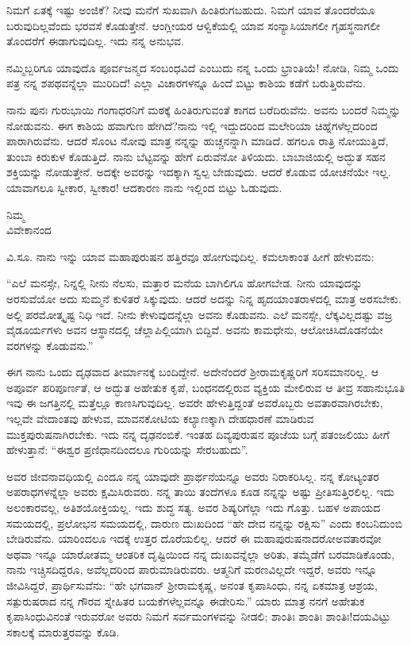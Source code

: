 ನಿಮಗೆ ಏತಕ್ಕೆ ಇಷ್ಟು ಅಂಜಿಕೆ? ನೀವು ಮನೆಗೆ ಸುಖವಾಗಿ ಹಿಂತಿರುಗಬಹುದು. ನಿಮಗೆ ಯಾವ ತೊಂದರೆಯೂ ಬರುವುದಿಲ್ಲವೆಂದು ಭರವಸೆ ಕೊಡುತ್ತೇನೆ. ಆಂಗ್ಲೀಯರ ಆಳ್ವಿಕೆಯಲ್ಲಿ ಯಾವ ಸಂನ್ಯಾಸಿಯಾಗಲೀ ಗೃಹಸ್ಥನಾಗಲೀ ತೊಂದರೆಗೆ ಈಡಾಗುವುದಿಲ್ಲ. ಇದು ನನ್ನ ಅನುಭವ.

ನಮ್ಮಿಬ್ಬರಿಗೂ ಯಾವುದೊ ಪೂರ್ವಜನ್ಮದ ಸಂಬಂಧವಿದೆ ಎಂಬುದು ನನ್ನ ಒಂದು ಭ್ರಾಂತಿಯೆ! ನೋಡಿ, ನಿಮ್ಮ ಒಂದು ಪತ್ರ ನನ್ನ ಶಪಥವನ್ನೆಲ್ಲಾ ಮುರಿದಿದೆ! ಎಲ್ಲಾ ವಿಚಾರಗಳನ್ನೂ ಹಿಂದೆ ಬಿಟ್ಟು ಕಾಶಿಯ ಕಡೆಗೆ ಬರುತ್ತಿರುವೆನು.

ನಾನು ಪುನಃ ಗುರುಭಾಯಿ ಗಂಗಾಧರನಿಗೆ ಮಠಕ್ಕೆ ಹಿಂತಿರುಗುವಂತೆ ಕಾಗದ ಬರೆದಿರುವೆನು. ಅವನು ಬಂದರೆ ನಿಮ್ಮನ್ನು ನೋಡುವನು. ಈಗ ಕಾಶಿಯ ಹವಾಗುಣ ಹೇಗಿದೆ?ನಾನು ಇಲ್ಲಿ ಇದ್ದುದರಿಂದ ಮಲೇರಿಯಾ ಚಿಹ್ನೆಗಳೆಲ್ಲದರಿಂದ ಪಾರಾಗಿರುವೆನು. ಆದರೆ ಸೊಂಟ ನೋವು ಮಾತ್ರ ನನ್ನನ್ನು ಹುಚ್ಚನನ್ನಾಗಿ ಮಾಡಿದೆ. ಹಗಲೂ ರಾತ್ರಿ ನೋಯುತ್ತಿದೆ, ತುಂಬಾ ಕಿರುಕುಳ ಕೊಡುತ್ತಿದೆ. ನಾನು ಬೆಟ್ಟವನ್ನು ಹೇಗೆ ಏರುವೆನೋ ತಿಳಿಯದು. ಬಾಬಾಜಿಯಲ್ಲಿ ಅದ್ಭುತ ಸಹನ ಶಕ್ತಿಯನ್ನು ನೋಡುತ್ತೇನೆ. ಅದಕ್ಕೇ ಅವರನ್ನು ಇದಕ್ಕಾಗಿ ಸ್ವಲ್ಪ ಬೇಡುವುದು. ಆದರೆ ಕೊಡುವ ಯೋಚನೆಯೇ ಇಲ್ಲ. ಯಾವಾಗಲೂ ಸ್ವೀಕಾರ, ಸ್ವೀಕಾರ! ಆದಕಾರಣ ನಾನು ಇಲ್ಲಿಂದ ಬಿಟ್ಟು ಓಡುವುದು.

{\flushright
ನಿಮ್ಮ\\ವಿವೇಕಾನಂದ\par}

ವಿ.ಸೂ. \enginline{-}ನಾನು ಇನ್ನು ಯಾವ ಮಹಾಪುರುಷನ ಹತ್ತಿರವೂ ಹೋಗುವುದಿಲ್ಲ. ಕಮಲಾಕಾಂತ ಹೀಗೆ ಹೇಳುವನು:

“ಎಲೆ ಮನಸ್ಸೇ, ನಿನ್ನಲ್ಲಿ ನೀನು ನೆಲಸು, ಮತ್ತಾರ ಮನೆಯ ಬಾಗಿಲಿಗೂ ಹೋಗಬೇಡ. ನೀನು ಯಾವುದನ್ನು ಅರಸುವೆಯೋ ಅದು ಸುಮ್ಮನೆ ಕುಳಿತರೆ ಸಿಕ್ಕುವುದು. ಆದರೆ ಅದನ್ನು ನಿನ್ನ ಹೃದಯಾಂತರಾಳದಲ್ಲಿ ಮಾತ್ರ ಅರಸಬೇಕು. ಅಲ್ಲಿ ಪರಮೋತ್ಕೃಷ್ಟ ನಿಧಿ ಇದೆ. ನೀನು ಕೇಳುವುದನ್ನೆಲ್ಲಾ ಅವನು ಕೊಡುವನು. ಎಲೆ ಮನಸ್ಸೇ, ಲೆಕ್ಕವಿಲ್ಲದಷ್ಟು ವಜ್ರ ವೈಡೂರ್ಯಗಳು ಅವನ ಆಸ್ಥಾನದಲ್ಲಿ ಚೆಲ್ಲಾಪಿಲ್ಲಿಯಾಗಿ ಬಿದ್ದಿವೆ. ಅವನು ಕಾಮಧೇನು, ಆಲೋಚಿಸಿದೊಡನೆಯೇ ವರಗಳನ್ನು ಕೊಡುವನು.”

ಈಗ ನಾನು ಒಂದು ದೃಢವಾದ ತೀರ್ಮಾನಕ್ಕೆ ಬಂದಿದ್ದೇನೆ. ಅದೇನೆಂದರೆ ಶ‍್ರೀರಾಮ\break ಕೃಷ್ಣರಿಗೆ ಸರಿಸಮಾನರಿಲ್ಲ. ಆ ಅಪೂರ್ವ ಪರಿಪೂರ್ಣತೆ, ಆ ಅದ್ಭುತ ಅಹೇತುಕ ಕೃಪೆ, ಬಂಧನದಲ್ಲಿರುವ ವ್ಯಕ್ತಿಯ ಮೇಲಿರುವ ಆ ತೀವ್ರ ಸಹಾನುಭೂತಿ ಇವು ಈ ಜಗತ್ತಿನಲ್ಲಿ ಮತ್ತೆಲ್ಲೂ ಕಾಣಸಿಗುವುದಿಲ್ಲ. ಅವರೇ ಹೇಳುತ್ತಿದ್ದಂತೆ ಅವರೊಬ್ಬರು ಅವತಾರವಾಗಿರಬೇಕು, ಇಲ್ಲವೇ ವೇದಾಂತವು ಹೇಳುವ, ಮಾವನಕೋಟಿಯ ಕಲ್ಯಾಣಕ್ಕಾಗಿ ದೇಹಧಾರಣೆ ಮಾಡಿರುವ ಮುಕ್ತಪುರುಷನಾಗಿರಬೇಕು. ಇದು ನನ್ನ ದೃಢನಂಬಿಕೆ. ಇಂತಹ ದಿವ್ಯಪುರುಷನ ಪೂಜೆಯ ಬಗ್ಗೆ ಪತಂಜಲಿಯು ಹೀಗೆ ಹೇಳುತ್ತಾನೆ: “ಈಶ್ವರ ಪ್ರಣಿಧಾನದಿಂದಲೂ ಗುರಿಯನ್ನು ಸೇರಬಹುದು”.

ಅವರ ಜೀವನಾವಧಿಯಲ್ಲಿ ಎಂದೂ ನನ್ನ ಯಾವುದೇ ಪ್ರಾರ್ಥನೆಯನ್ನೂ ಅವರು ನಿರಾಕರಿಸಿಲ್ಲ. ನನ್ನ ಕೋಟ್ಯಂತರ ಅಪರಾಧಗಳನ್ನೆಲ್ಲಾ ಅವರು ಕ್ಷಮಿಸಿರುವರು. ನನ್ನ ತಾಯಿ ತಂದೆಗಳೂ ಕೂಡ ನನ್ನನ್ನು ಅಷ್ಟು ಪ್ರೀತಿಸುತ್ತಿರಲಿಲ್ಲ. ಇದು ಅಲಂಕಾರವಲ್ಲ, ಅತಿಶಯೋಕ್ತಿಯಲ್ಲ. ಇದು ಶುದ್ಧ ಸತ್ಯ. ಅವರ ಶಿಷ್ಯರಿಗೆಲ್ಲಾ ಇದು ಗೊತ್ತು. ಬಹಳ ಅಪಾಯದ ಸಮಯದಲ್ಲಿ, ಪ್ರಲೋಭನ ಸಮಯದಲ್ಲಿ, ದಾರುಣ ದುಃಖದಿಂದ ``ಹೇ ದೇವ ನನ್ನನ್ನು ರಕ್ಷಿಸು'' ಎಂದು ಕಂಬನಿದುಂಬಿ ಬೇಡಿರುವೆನು. ಯಾರಿಂದಲೂ ಇದಕ್ಕೆ ಉತ್ತರ ದೊರೆಯಲಿಲ್ಲ. ಆದರೆ ಈ ಮಹಾಪುರುಷನಾದರೋ\enginline{-}ಅವತಾರವೋ ಅಥವಾ ಇನ್ನೂ ಯಾರೋ\enginline{-}ತಮ್ಮ ಆಂತರಿಕ ದೃಷ್ಟಿಯಿಂದ ನನ್ನ ದುಃಖವನ್ನೆಲ್ಲಾ ಅರಿತು, ತಮ್ಮೆಡೆಗೆ ಬರಮಾಡಿಕೊಂಡು, ನಾನು ಇಚ್ಚಿಸದಿದ್ದರೂ, ಅವೆಲ್ಲದರಿಂದ ಪಾರುಮಾಡಿರುವರು. ಆತ್ಮನಿಗೆ ಮರಣವಿಲ್ಲದೇ ಇದ್ದರೆ, ಅವರು ಇನ್ನೂ ಜೀವಿಸಿದ್ದರೆ, ಪ್ರಾರ್ಥಿಸುವೆನು: “ಹೇ ಭಗವಾನ್ ಶ‍್ರೀರಾಮಕೃಷ್ಣ, ಅನಂತ ಕೃಪಾಸಿಂಧು, ನನ್ನ ಏಕಮಾತ್ರ ಆಶ್ರಯ, ಸತ್ಪುರುಷರಾದ ನನ್ನ ಗೌರವ ಸ್ನೇಹಿತರ ಬಯಕೆಗಳೆಲ್ಲವನ್ನೂ ಈಡೇರಿಸು.” ಯಾರು ಮಾತ್ರ ನನಗೆ ಅಹೇತುಕ ಕೃಪಾಸಿಂಧುವಿನಂತೆ ಇರುವರೋ ಅವರು ನಿಮಗೆ ಸರ್ವಮಂಗಳವನ್ನು ನೀಡಲಿ; ಶಾಂತಿಃ ಶಾಂತಿಃ ಶಾಂತಿಃ!ದಯವಿಟ್ಟು ಸಕಾಲಕ್ಕೆ ಮಾರುತ್ತರವನ್ನು ಕೊಡಿ.

